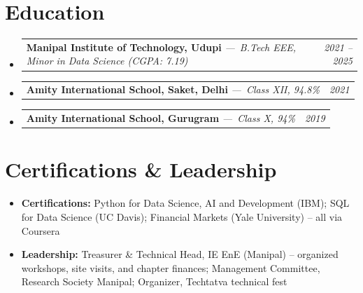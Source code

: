\documentclass[a4paper,11pt]{article}
\makeatletter
\newcommand{\resumeEduLine}[3]{
\vspace{-1pt}\item
\begin{tabular*}{0.97\textwidth}{l@{\extracolsep{\fill}}r}
\textbf{#1} \textit{\small ---\ #2} & \textit{#3} \\
\end{tabular*}\vspace{-4pt}
}
\newcommand{\resumeItem}[1]{
\item\small{#1}
}
\newcommand{\resumeSubHeadingListStart}{\begin{itemize}[leftmargin=*,itemsep=2pt,topsep=2pt,parsep=0pt]}
\newcommand{\resumeSubHeadingListEnd}{\end{itemize}}
\makeatother
\begin{document}
\section{Education}
\resumeSubHeadingListStart
\resumeEduLine{Manipal Institute of Technology, Udupi}{B.Tech EEE, Minor in Data Science (CGPA: 7.19)}{2021 -- 2025}
\resumeEduLine{Amity International School, Saket, Delhi}{Class XII, 94.8\%}{2021}
\resumeEduLine{Amity International School, Gurugram}{Class X, 94\%}{2019}
\resumeSubHeadingListEnd

\section{Certifications \& Leadership}
\begin{itemize}[leftmargin=*,itemsep=0pt,topsep=1pt,parsep=0pt]
\resumeItem{\textbf{Certifications:} Python for Data Science, AI and Development (IBM); SQL for Data Science (UC Davis); Financial Markets (Yale University) -- all via Coursera}
\resumeItem{\textbf{Leadership:} Treasurer \& Technical Head, IE EnE (Manipal) -- organized workshops, site visits, and chapter finances; Management Committee, Research Society Manipal; Organizer, Techtatva technical fest}
\end{itemize}
\end{document}
